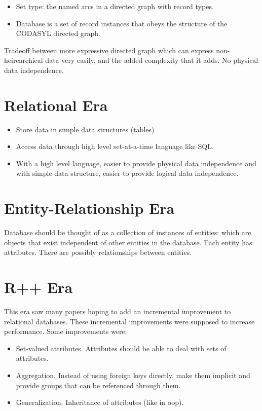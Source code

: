 \documentclass[psamsfonts]{amsart}
\begin{document}
\begin{itemize}
  \item Set type: the named arcs in a directed graph with record types. 
  \item Database is a set of record instances that obeys the structure of the CODASYL directed graph.
\end{itemize}

Tradeoff between more expressive directed graph which can express non-heirearchical data very easily, and the added complexity that it adds. No physical data independence.

\section{Relational Era}

\begin{itemize}
  \item Store data in simple data structures (tables)
  \item Access data through high level set-at-a-time language like SQL.
  \item With a high level language, easier to provide physical data independence and with simple data structure, easier to provide logical data independence.
\end{itemize}

\section{Entity-Relationship Era}

Database should be thought of as a collection of instances of entities: which are objects that exist independent of other entities in the database. Each entity has attributes. There are possibly relationships between entities.

\section{R++ Era}

This era saw many papers hoping to add an incremental improvement to relational databases. These incremental improvements were supposed to increase performance. Some improvements were:

\begin{itemize}
  \item Set-valued attributes. Attributes should be able to deal with sets of attributes.
  \item Aggregation. Instead of using foreign keys directly, make them implicit and provide groups that can be referenced through them.
  \item Generalization. Inheritance of attributes (like in oop).
\end{itemize}
\end{document}
